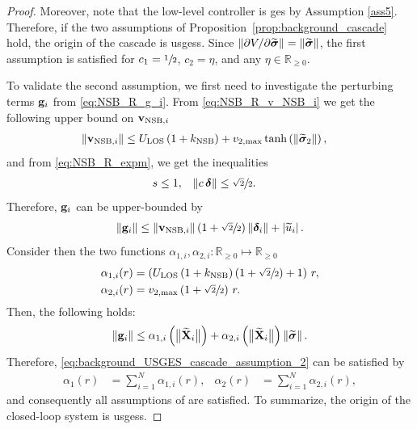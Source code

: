 \begin{proof}
    

    Moreover, note that the low-level controller is \gls{ges} by Assumption \ref{ass5}.
    Therefore, if the two assumptions of Proposition~\ref{prop:background_cascade} hold, the origin of the cascade is \glspl{usges}.
    Since $\left\|\partial V / \partial \widetilde{\bm{\sigma}}\right\| = \left\|\widetilde{\bm{\sigma}}\right\|$, the first assumption is satisfied for $c_1 = \sfrac{1}{2}$, $c_2 = \eta$, and any $\eta \in \mathbb{R}_{\geq 0}$.    

    To validate the second assumption, we first need to investigate the perturbing terms $\mathbf{g}_i$ from \eqref{eq:NSB_R_g_i}.
    From \eqref{eq:NSB_R_v_NSB_i} we get the following upper bound on $\mathbf{v}_{{\rm NSB}, i}$ 
    \begin{align}
        \left\|\mathbf{v}_{{\rm NSB}, i}\right\| &\leq U_{\rm LOS}\left(1 + k_{\rm NSB}\right) + v_{2, \max}\tanh\left(\left\|\widetilde{\bm{\sigma}}_2\right\|\right),
    \end{align}
    and from \eqref{eq:NSB_R_expm}, we get the inequalities 
    \begin{align}
        s &\leq 1, &
        \left\|c\,\bm{\delta}\right\| &\leq \sfrac{\sqrt{2}}{2}.
    \end{align}
    Therefore, $\mathbf{g}_i$ can be upper-bounded by 
    \begin{equation}
        \left\|\mathbf{g}_i\right\| \leq \left\|\mathbf{v}_{{\rm NSB}, i}\right\|\left(1 + \sfrac{\sqrt{2}}{2}\right)\left\|\bm{\delta}_i\right\| + \left|\widetilde{u}_i\right|.
    \end{equation}
    Consider then the two functions $\alpha_{1,i}, \alpha_{2,i} : \mathbb{R}_{\geq 0} \mapsto \mathbb{R}_{\geq 0}$ 
    \begin{align}
        \alpha_{1,i}(r) &= \left(U_{\rm LOS}\left(1 + k_{\rm NSB}\right)\left(1 + \sfrac{\sqrt{2}}{2}\right) + 1\right)\,r, \\
        \alpha_{2,i}(r) &= v_{2, \max}\left(1 + \sfrac{\sqrt{2}}{2}\right)\,r.
    \end{align}
    Then, the following holds: 
    \begin{equation}
        \left\|\mathbf{g}_i\right\| \leq \alpha_{1,i}\left(\bigl\|\widetilde{\mathbf{X}}_i\bigr\|\right) + 
                            \alpha_{2,i}\left(\bigl\|\widetilde{\mathbf{X}}_i\bigr\|\right)\left\|\widetilde{\bm{\sigma}}\right\|. \label{eq:NSB_R_perturbing_term}
    \end{equation}
    Therefore, \eqref{eq:background_USGES_cascade_assumption_2} can be satisfied by 
    \begin{align}
        \alpha_1(r) &= \sum_{i=1}^N \alpha_{1,i}(r), &
        \alpha_2(r) &= \sum_{i=1}^N \alpha_{2,i}(r),
    \end{align}
    and consequently all assumptions of \cite[Proposition~9]{pettersen_lyapunov_2017} are satisfied. To summarize, the origin of the closed-loop system is \glspl{usges}.


\end{proof}
